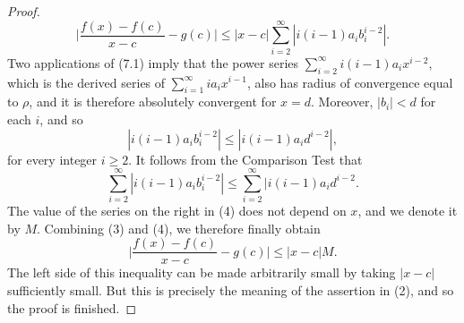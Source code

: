 \begin{proof}
\begin{equation}
\Big|\frac{f(x) - f(c)}{x-c} - g(c)\Big| \leq |x - c| \sum_{i=2}^\infty |i(i-1)a_ib_i^{i-2} | . 
\label{eq9.7.3}
\end{equation}
Two applications of (7.1) imply that the power series $\sum_{i=2}^\infty i(i-1) a_i x^{i-2}$, which is the derived series of $\sum_{i=1}^\infty i a_ix^{i-1}$, also has radius of convergence equal to $\rho$, and it is therefore absolutely convergent for $x = d$. Moreover, $|b_i| < d$ for each $i$, and so
$$
|i(i- 1)a_i b_i^{i -2}| \leq | i(i-1)a_id^{i -2}|,
$$
for every integer $i \geq 2$. It follows from the Comparison Test that
\begin{equation}
\sum_{i=2}^\infty |i(i- 1)a_ib_i^{i-2}| \leq \sum_{i=2}^\infty |i(i- 1)a_id^{i -2}. 
\label{eq9.7.4}
\end{equation}
The value of the series on the right in (4) does not depend on $x$, and we denote it by $M$. Combining (3) and (4), we therefore finally obtain
$$
\Big|\frac{f(x)- f(c)}{x-c} - g(c)\Big| \leq |x - c| M.
$$
The left side of this inequality can be made arbitrarily small by taking $|x-c|$ sufficiently small. But this is precisely the meaning of the assertion in (2), and so the proof is finished.
\end{proof}

